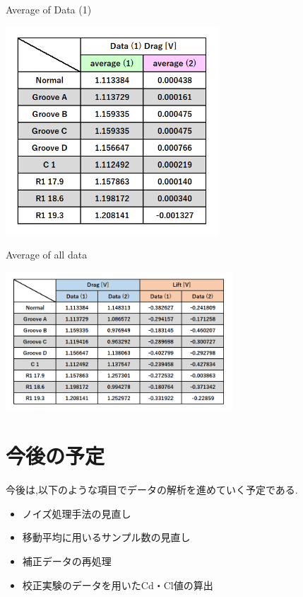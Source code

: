 \documentclass[twocolumn,a4j]{jsarticle}
\begin{document}
\begin{table}[htbp]
    \footnotesize
    \caption{Average of Data (1)}
    \begin{center}
        \includegraphics[width=80mm]{images/Picture2.png}
    \end{center}
\end{table}
\begin{table}[htbp]
    \footnotesize
    \caption{Average of all data}
    \begin{center}
        \includegraphics[width=85mm]{images/Picture1.png}
    \end{center}
\end{table}
\newpage
\section{今後の予定}
今後は,以下のような項目でデータの解析を進めていく予定である.
\begin{itemize}
    \item ノイズ処理手法の見直し
    \item 移動平均に用いるサンプル数の見直し
    \item 補正データの再処理
    \item 校正実験のデータを用いたCd・Cl値の算出
\end{itemize}
\end{document}
